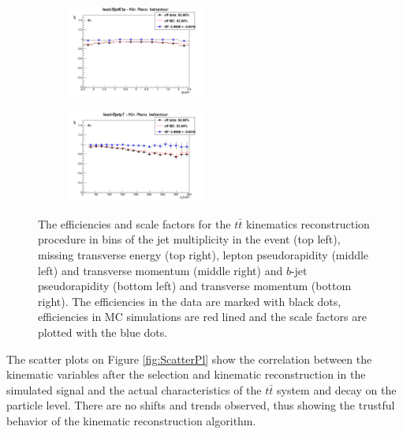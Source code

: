 \begin{figure}[t]
\begin{subfigure}
\end{subfigure}
\begin{subfigure}
  \centering
  \includegraphics[width=0.49\textwidth]{05_kinReco/plots/eff_SF/KinRecoEff_JetEta.png}
\end{subfigure}
\begin{subfigure}
  \centering
  \includegraphics[width=0.49\textwidth]{05_kinReco/plots/eff_SF/KinRecoEff_JetpT.png}
\end{subfigure}
\caption{The efficiencies and scale factors for the $t\bar{t}$ kinematics reconstruction procedure in bins of the jet multiplicity in the event (top left),
         missing transverse energy (top right), lepton pseudorapidity (middle left) and transverse momentum (middle right) and $b$-jet pseudorapidity (bottom left) 
         and transverse momentum (bottom right). The efficiencies in the data 
         are marked with black dots, efficiencies in MC simulations are red lined and the scale factors are plotted with the blue dots.}
\label{fig:EffSF}
\end{figure}

The scatter plots on Figure \ref{fig:ScatterPl} show the correlation between the kinematic variables after the selection and kinematic reconstruction in the simulated
signal and the actual characteristics of the $t\bar{t}$ system and decay on the particle level. There are no shifts and trends observed, thus showing 
the trustful behavior of the kinematic reconstruction algorithm.

